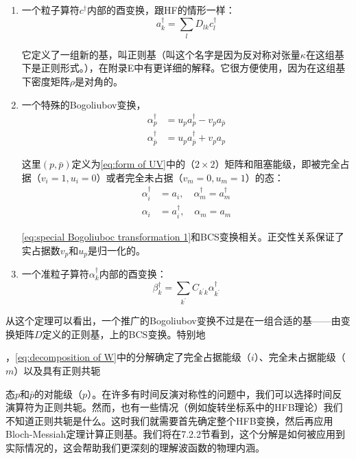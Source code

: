\begin{enumerate}
\item 一个粒子算符$c^{\dagger}$内部的酉变换，跟HF的情形一样：
\[
a^{\dagger}_{k}=\sum_{l}D_{lk}c^{\dagger}_{l}
\]

它定义了一组新的基，叫正则基（叫这个名字是因为反对称对张量$\kappa$在这组基下是正则形式。），在附录E中有更详细的解释。它很方便使用，因为在这组基下密度矩阵$\rho$是对角的。
\item 一个特殊的Bogoliubov变换，
\begin{align}
\alpha^{\dagger}_{p} & =u_{p}a^{\dagger}_{p}-v_{p}a_{\bar{p}}\nonumber \\
\alpha^{\dagger}_{\bar{p}} & =u_{p}a^{\dagger}_{\bar{p}}+v_{p}a_{p}\label{eq:special Bogoliuboc transformation 1}
\end{align}

这里$(p,\bar{p})$定义为\ref{eq:form of UV}中的（$2\times2$）矩阵和阻塞能级，即被完全占据（$v_{i}=1,u_{i}=0$）或者完全未占据（$v_{m}=0,u_{m}=1$）的态：
\begin{align}
\alpha^{\dagger}_{i} & =a_{i},\quad\alpha^{\dagger}_{m}=a^{\dagger}_{m}\nonumber \\
\alpha_{i} & =a^{\dagger}_{i},\quad\alpha_{m}=a_{m}\label{eq:special Bogoliubov transformation 2}
\end{align}

\ref{eq:special Bogoliuboc transformation 1}和BCS变换相关。正交性关系保证了实占据数$v_{p}$和$u_{p}$是归一化的。
\item 一个准粒子算符$\alpha^{\dagger}_{k}$内部的酉变换：
\[
\beta^{\dagger}_{k}=\sum_{k^{\prime}}C_{k^{\prime}k}\alpha^{\dagger}_{k^{\prime}}
\]
\end{enumerate}
从这个定理可以看出，一个推广的Bogoliubov变换不过是在一组合适的基——由变换矩阵$D$定义的正则基，上的BCS变换。特别地

，\ref{eq:decomposition of W}中的分解确定了完全占据能级（$i$）、完全未占据能级（$m$）以及具有正则共轭

态$p$和$\bar{p}$的对能级（$p$）。在许多有时间反演对称性的问题中，我们可以选择时间反演算符为正则共轭。然而，也有一些情况（例如旋转坐标系中的HFB理论）我们不知道正则共轭是什么。这时我们就需要首先确定整个HFB变换，然后再应用Bloch-Messiah定理计算正则基。我们将在7.2.2节看到，这个分解是如何被应用到实际情况的，这会帮助我们更深刻的理解波函数的物理内涵。

